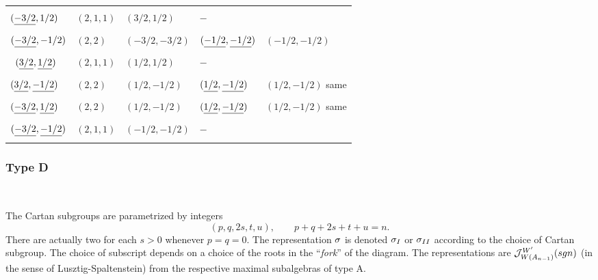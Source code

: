 \documentclass[11pt ,reqno]{amsart}
\begin{document}
{\begin{example*}[$Mp(4,\bb R)$]
\begin{tabular}{|l|l|l|l|l|}
  &&&&\\ %
  $({\underline{-3/2}},1/2)$&$(2,1,1)$&$(3/2,1/2)$&$-$ &\\
  &&&&\\ %
  $({\underline{-3/2}},-1/2)$&$(2,2)$&$(-3/2,-3/2)$&$({\underline{-1/2}},{\underline{-1/2}})$ &$(-1/2,-1/2)$\\
  &&&&\\ %
  \ $({\underline{3/2}},{\underline{1/2}})$&$(2,1,1)$&$(1/2,1/2)$&$-$ &\\
  &&&&\\  %
  $({\underline{3/2}},{\underline{-1/2}})$&$(2,2)$&$(1/2,-1/2)$&$({\underline{1/2}},{\underline{-1/2}})$ &$(1/2,-1/2)$ same\\
  &&&&\\ %
  $({\underline{-3/2}},{\underline{1/2}})$&$(2,2)$&$(1/2,-1/2)$&$({\underline{1/2}},{\underline{-1/2}})$&$(1/2,-1/2)$ same\\
  &&&&\\ %
  $({\underline{-3/2}},{\underline{-1/2}})$&$(2,1,1)$&$(-1/2,-1/2)$&$-$ &\\
  &&&&\\
  \hline
\end{tabular}
\end{example*}
}
\newpage

\subsubsection{Type D}\label{2.3}\
\begin{comment}
{\clrr This seems to count for $O(a,b)$, as well as for $SO(a,b).$ Some Cartan subgroups become conjugate under $O(a,b)$; so fewer parameters. On the other hand, representations extend in two different ways}. 
\end{comment}
The Cartan subgroups are parametrized by
integers 
$$
(p,q,2s,t,u),\qquad p+q+2s+t+u=n.
$$
There are
actually two \CSGs for each $s>0$ whenever $p=q=0$. The representation ${\sigma}$ is
denoted ${\sigma}_I$ or ${\sigma}_{II}$ according to the choice of Cartan
subgroup. The choice of subscript depends on a choice of the roots in
the ``\textit{fork}'' of the diagram. The representations are ${\mathcal J}_{W(A_{n-1})}^{W'}(sgn)$ (in
the sense of Lusztig-Spaltenstein) from the
respective maximal subalgebras of type A.
\end{document}
